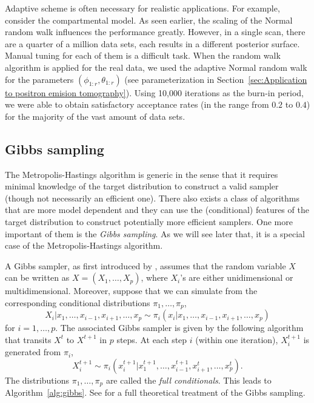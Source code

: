 Adaptive scheme is often necessary for realistic applications. For example,
consider the \pet compartmental model. As seen earlier, the scaling of the
Normal random walk influences the performance greatly. However, in a single
\pet scan, there are a quarter of a million data sets, each results in a
different posterior surface. Manual tuning for each of them is a difficult
task. When the random walk algorithm is applied for the real data, we used the
adaptive Normal random walk for the parameters $(\phi_{1:r},\theta_{1:r})$
(see parameterization in Section~\ref{sec:Application to positron emision
  tomography}). Using 10,000 iterations as the burn-in period, we were able to
obtain satisfactory acceptance rates (in the range from $0.2$ to $0.4$) for
the majority of the vast amount of data sets.

\subsection{Gibbs sampling}
\label{sub:Gibbs sampling}

The Metropolis-Hastings algorithm is generic in the sense that it requires
minimal knowledge of the target distribution to construct a valid sampler
(though not necessarily an efficient one). There also exists a class of \mcmc
algorithms that are more model dependent and they can use the (conditional)
features of the target distribution to construct potentially more efficient
samplers. One more important of them is the \emph{Gibbs sampling}. As we will
see later that, it is a special case of the Metropolis-Hastings algorithm.

A Gibbs sampler, as first introduced by \cite{Geman:1993bp}, assumes that the
random variable $X$ can be written as $X = (X_1,\dots,X_p)$, where $X_i$'s are
either unidimensional or multidimensional. Moreover, suppose that we can
simulate from the corresponding conditional distributions $\pi_1,\dots,\pi_p$,
\begin{equation}
  X_i|x_1,\dots,x_{i-1},x_{i+1},\dots,x_p
  \sim \pi_i(x_i|x_1,\dots,x_{i-1},x_{i+1},\dots,x_p)
\end{equation}
for $i = 1,\dots,p$. The associated Gibbs sampler is given by the following
algorithm that transits $X^t$ to $X^{t+1}$ in $p$ steps. At each step $i$
(within one iteration), $X_i^{t+1}$ is generated from $\pi_i$,
\begin{equation}
  X_i^{t+1} \sim
  \pi_i(x_i^{t+1}|x_1^{t+1},\dots,x_{i-1}^{t+1},x_{i+1}^t,\dots,x_p^t).
\end{equation}
The distributions $\pi_1,\dots,\pi_p$ are called the \emph{full conditionals}.
This leads to Algorithm~\ref{alg:gibbs}. See \cite[][chap.~8
and~9]{Robert:2004tn} for a full theoretical treatment of the Gibbs sampling.

